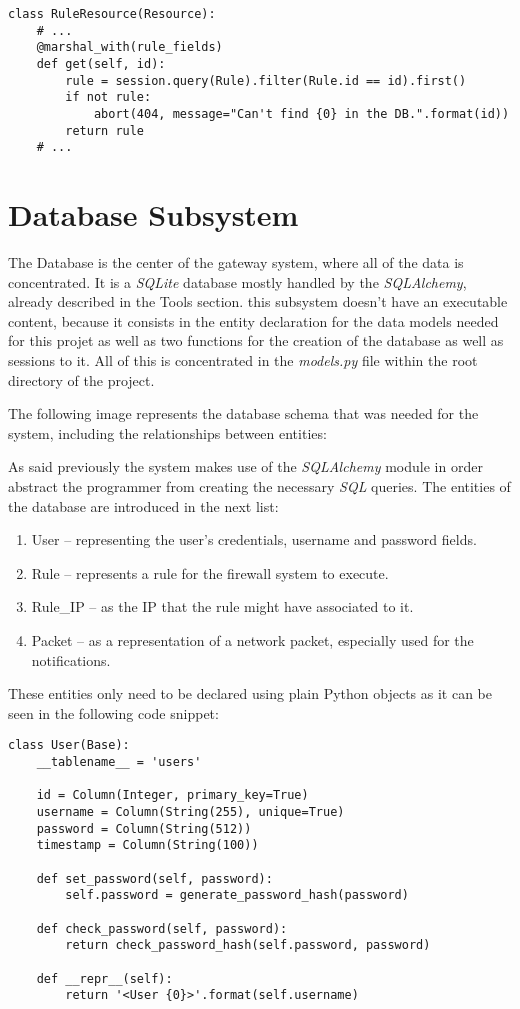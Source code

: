 \begin{lstlisting}[caption=Example of the use of marshal\_with decorator.]
class RuleResource(Resource):
	# ...
	@marshal_with(rule_fields)
	def get(self, id):
		rule = session.query(Rule).filter(Rule.id == id).first()
		if not rule:
			abort(404, message="Can't find {0} in the DB.".format(id))
		return rule
	# ...
\end{lstlisting}

\section{Database Subsystem}
\label{chap4:sec:db-sys}

The Database is the center of the gateway system, where all of the data is
concentrated.
It is a \emph{SQLite} database mostly handled by the \emph{SQLAlchemy}, already
described in the Tools section. this subsystem doesn't have an executable
content, because it consists in the entity declaration for the data models
needed for this projet as well as two functions for the creation of the database
as well as sessions to it. All of this is concentrated in the \emph{models.py}
file within the root directory of the project.

The following image represents the database schema that was needed for the
system, including the relationships between entities:


As said previously the system makes use of the \emph{SQLAlchemy} module in order
abstract the programmer from creating the necessary \emph{\ac{SQL}} queries. The
entities of the database are introduced in the next list:
\begin{enumerate}
	\item User -- representing the user's credentials, username and password
		fields.
	\item Rule -- represents a rule for the firewall system to execute.
	\item Rule\_IP -- as the IP that the rule might have associated to it.
	\item Packet -- as a representation of a network packet, especially used for
		the notifications.
\end{enumerate}

These entities only need to be declared using plain Python objects as it can be
seen in the following code snippet:
\begin{lstlisting}[caption=Example of the User entity declaration.]
class User(Base):
    __tablename__ = 'users'

    id = Column(Integer, primary_key=True)
    username = Column(String(255), unique=True)
    password = Column(String(512))
    timestamp = Column(String(100))

    def set_password(self, password):
        self.password = generate_password_hash(password)

    def check_password(self, password):
        return check_password_hash(self.password, password)

    def __repr__(self):
        return '<User {0}>'.format(self.username)
\end{lstlisting}

